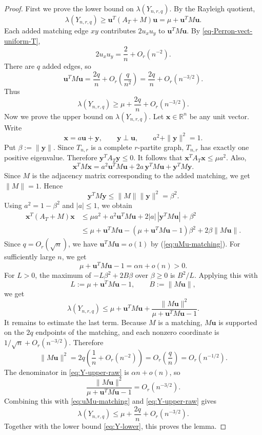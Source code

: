 \documentclass[11pt,a4paper]{article}
\theoremstyle{definition}
\theoremstyle{plain}
\renewcommand{\le}{\leqslant}
\renewcommand{\ge}{\geqslant}
\begin{document}
\begin{proof}
First we prove the lower bound on $\lambda (Y_{n,r,q})$. 
By the Rayleigh quotient,
\[
        \lambda(Y_{n,r,q})
        \ge \bm{u}^T(A_T+M) \bm{u}
        =\mu+ \bm{u}^TM \bm{u}.
\]
Each added matching edge $xy$ contributes $2u_xu_y$ to $\bm{u}^TM \bm{u}$. By
\eqref{eq-Perron-vect-uniform-T},
\[
        2u_xu_y=\frac2n+O_r(n^{-2}).
\]
There are $q$ added edges, so
\begin{equation}
        \bm{u}^TM\bm{u}=\frac{2q}{n}+O_r\left(\frac q{n^2}\right)
             =\frac{2q}{n}+O_r(n^{-3/2}).
        \label{eq:uMu-matching}
\end{equation}
Thus
\begin{equation}
        \lambda(Y_{n,r,q})
        \ge \mu+\frac{2q}{n}+O_r(n^{-3/2}).
        \label{eq:Y-lower}
\end{equation} 
Now we prove the upper bound on $\lambda(Y_{n,r,q})$. 
Let $\bm{x} \in \mathbb{R}^n$ be any unit vector. Write
\[
        \bm{x}=a \bm{u}+ \bm{y},
        \qquad
        \bm{y}\perp \bm{u},
        \qquad
        a^2+\|\bm{y}\|^2=1.
\]
Put $\beta:=\|\bm{y}\|$. 
Since $T_{n,r}$ is a complete $r$-partite graph, $T_{n,r}$ has exactly one positive eigenvalue. Therefore
$ \bm{y}^TA_T \bm{y}\le 0$. 
It follows that $ \bm{x}^TA_T \bm{x}\le \mu a^2$. 
Also,
\[
        \bm{x}^TM \bm{x} 
        =a^2\bm{u}^TM \bm{u} 
        +2a\,\bm{y}^TM \bm{u} + \bm{y}^TM\bm{y}.
\]
Since $M$ is the adjacency matrix corresponding to the added matching, we get $\|M\|=1$. Hence
\[
        \bm{y}^TM\bm{y}\le \|M\|\| \bm{y} \|^2=\beta^2.
\]
Using $a^2=1-\beta^2$ and $|a|\le 1$, we obtain
\begin{align*}
        \bm{x}^T(A_T+M)\bm{x}
        &\le \mu a^2+a^2 \bm{u}^TM \bm{u}+2|a|\,|\bm{y}^TM\bm{u}|+\beta^2  \\
        &\le \mu+ \bm{u}^TM \bm{u}-(\mu+ \bm{u}^TM\bm{u}-1)\beta^2+2\beta\|M\bm{u}\|.
\end{align*}
Since $q=O_r(\sqrt{n})$, we have  $\bm{u}^TM\bm{u} =o(1)$ by (\ref{eq:uMu-matching}). 
For sufficiently large $n$, we get 
\[
        \mu+ \bm{u}^TM \bm{u} -1=\alpha n+o(n)>0.
\]
For $L>0$, the maximum of $-L\beta^2+2B\beta$ over $\beta\ge 0$ is $B^2/L$. Applying this
with
\[
        L:=\mu+ \bm{u}^TM \bm{u}-1,
        \qquad
        B:=\|M \bm{u}\|,
\]
we get
\begin{equation}
        \lambda(Y_{n,r,q})
        \le \mu+ \bm{u}^TM\bm{u}+
             \frac{\|M \bm{u}\|^2}{\mu+ \bm{u}^TM\bm{u}-1}.
        \label{eq:Y-upper-raw}
\end{equation}
It remains to estimate the last term. Because $M$ is a matching, $M \bm{u}$ is supported on the
$2q$ endpoints of the matching, and each nonzero coordinate is
$1/\sqrt n+O_r(n^{-3/2})$. Therefore
\[
        \|M\bm{u}\|^2
        =2q\left(\frac1n+O_r(n^{-2})\right)
        =O_r\left(\frac qn\right)
        =O_r(n^{-1/2}).
\]
The denominator in \eqref{eq:Y-upper-raw} is $\alpha n+o(n)$, so
\[
        \frac{\|M \bm{u}\|^2}{\mu+ 
        \bm{u}^TM\bm{u} -1}
        =O_r(n^{-3/2}).
\]
Combining this with \eqref{eq:uMu-matching} and \eqref{eq:Y-upper-raw} gives
\[
        \lambda(Y_{n,r,q})
        \le \mu+\frac{2q}{n}+O_r(n^{-3/2}).
\]
Together with the lower bound \eqref{eq:Y-lower}, this proves the lemma.
\end{proof}
\end{document}
